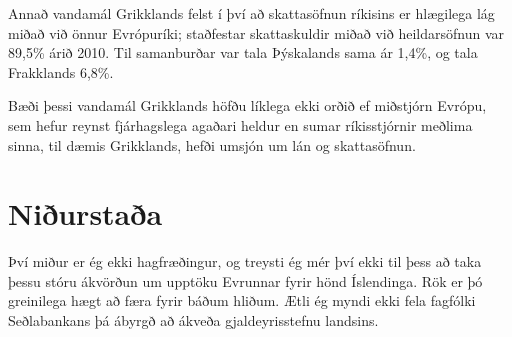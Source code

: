 \documentclass[a4paper]{article}
\begin{document}
Annað vandamál Grikklands felst í því að skattasöfnun ríkisins er hlægilega lág miðað við önnur Evrópuríki; staðfestar skattaskuldir miðað við heildarsöfnun var 89,5\% árið 2010. Til samanburðar var tala Þýskalands sama ár 1,4\%, og tala Frakklands 6,8\%.\cite{oecd_greece_taxes}

Bæði þessi vandamál Grikklands höfðu líklega ekki orðið ef miðstjórn Evrópu, sem hefur reynst fjárhagslega agaðari heldur en sumar ríkisstjórnir meðlima sinna, til dæmis Grikklands, hefði umsjón um lán og skattasöfnun.

\section{Niðurstaða}

Því miður er ég ekki hagfræðingur, og treysti ég mér því ekki til þess að taka þessu stóru ákvörðun um upptöku Evrunnar fyrir hönd Íslendinga. Rök er þó greinilega hægt að færa fyrir báðum hliðum. Ætli ég myndi ekki fela fagfólki Seðlabankans þá ábyrgð að ákveða gjaldeyrisstefnu landsins.

\newpage


\end{document}
